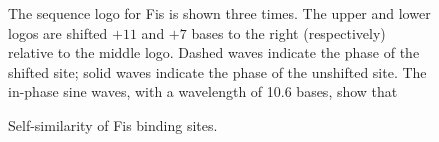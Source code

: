 \documentclass[doublespacing]{narfront}
\begin{document}
\begin{figure}[ht] %
\begin{center}
\end{center}
\vspace{-28pt}
\caption{Self-similarity of Fis binding sites.}
The sequence logo for Fis
\cite{Schneider.Stephens1990,Hengen.fisinfo}
is shown three times.
The upper and lower logos are shifted $+11$ and $+7$
bases to the right (respectively) relative to the middle logo.
Dashed waves indicate the phase of the shifted site;
solid waves indicate the phase of the unshifted site.
The in-phase sine waves, with a wavelength of 10.6 bases,
show that

\end{figure}
\end{document}
